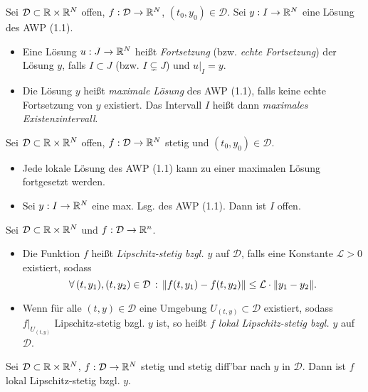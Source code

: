 \documentclass{cheat-sheet}
\newcommand{\D}{\mathcal{D}}
\begin{document}
\begin{defn}
  Sei $\D \subset \R \times \R^N$ offen, $f : \D \to \R^N$, $(t_0, y_0) \in \D$. Sei $y : I \to \mathbb{R}^N$ eine Lösung des AWP (1.1).
  \begin{itemize}
    \item Eine Lösung $u : J \to \mathbb{R}^N$ heißt \emph{Fortsetzung} (bzw. \emph{echte Fortsetzung}) der Lösung $y$, falls $I \subset J$ (bzw. $I \subsetneq J$) und $u|_I = y$.
    \item Die Lösung $y$ heißt \emph{maximale Lösung} des AWP (1.1), falls keine echte Fortsetzung von $y$ existiert. Das Intervall $I$ heißt dann \emph{maximales Existenzintervall}.
  \end{itemize}
\end{defn}


\begin{satz}
  Sei $\D \subset \R \times \R^N$ offen, $f : \D \to \R^N$ stetig und $(t_0, y_0) \in \D$.
  \begin{itemize}
    \item Jede lokale Lösung des AWP (1.1) kann zu einer maximalen Lösung fortgesetzt werden.
    \item Sei $y : I \to \mathbb{R}^N$ eine max. Lsg. des AWP (1.1). Dann ist $I$ offen.
  \end{itemize}
\end{satz}


\begin{defn}
  Sei $\D \subset \R \times \R^N$ und $f : \D \to \R^n$.
  \begin{itemize}
    \item Die Funktion $f $ heißt \emph{Lipschitz-stetig bzgl. $y$} auf $\D$, falls eine Konstante $\mathcal{L} > 0$ existiert, sodass
    \[ \fa{(t, y_1), (t, y_2) \in \D} \norm{f(t, y_1) - f(t, y_2)} \leq \mathcal{L} \cdot \norm{y_1 - y_2}. \]
    \item Wenn für alle $(t, y) \in \D$ eine Umgebung $U_{(t, y)} \subset \D$ existiert, sodass $f|_{U_{(t,y)}}$ Lipschitz-stetig bzgl. $y$ ist, so heißt $f$ \emph{lokal Lipschitz-stetig bzgl. $y$} auf $\D$.
  \end{itemize}
\end{defn}

\begin{lem}
  Sei $\D \subset \R \times \R^N$, $f : \D \to \R^N$ stetig und stetig diff'bar nach $y$ in $\D$. Dann ist $f$ lokal Lipschitz-stetig bzgl. $y$.
\end{lem}
\end{document}
